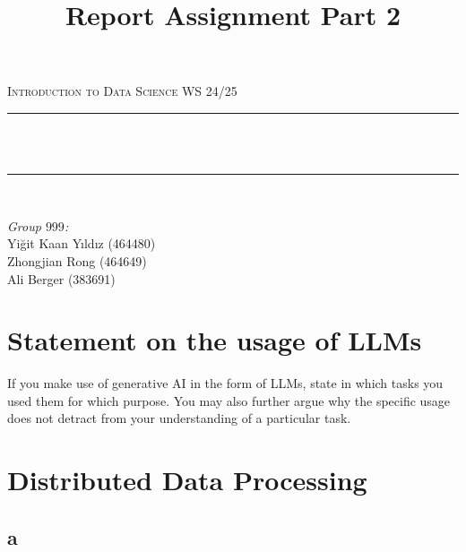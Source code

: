 \documentclass[12pt]{report}
\title{Report Assignment Part 2}
\author{}
\date{}
\makeatletter
\let\thetitle\@title
\makeatother
\begin{document}

    \begin{titlepage}
        \centering
        \vspace*{0.5 cm}
        \begin{center}
            \textsc{\Large Introduction to Data Science WS 24/25}\\[2.0 cm]
        \end{center}
        \rule{\linewidth}{0.2 mm} \\[0.4 cm]
        { \huge \bfseries \thetitle}\\
        \rule{\linewidth}{0.2 mm} \\[1.5 cm]

        \begin{flushright}
            \large
            \emph{Group $999$:} \\
            Yiğit Kaan Yıldız (464480) \\
            Zhongjian Rong (464649) \\
            Ali Berger (383691)
        \end{flushright}

    \end{titlepage}


     \section*{Statement on the usage of LLMs}
     \textlangle If you make use of generative AI in the form of LLMs, state in which tasks you used them for which purpose.
     You may also further argue why the specific usage does not detract from your understanding of a particular task. \textrangle

     \newpage

    \section{Distributed Data Processing}
    	\subsection{a}
\inputminted[fontsize=\tiny]{python}{ distributed_data_processing/best_movies.py  }

\end{document}

